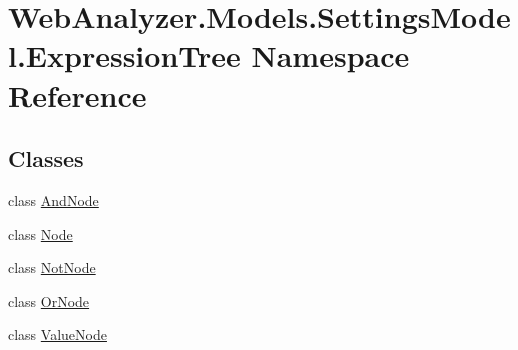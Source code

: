 \hypertarget{namespace_web_analyzer_1_1_models_1_1_settings_model_1_1_expression_tree}{}\section{Web\+Analyzer.\+Models.\+Settings\+Model.\+Expression\+Tree Namespace Reference}
\label{namespace_web_analyzer_1_1_models_1_1_settings_model_1_1_expression_tree}
\subsection*{Classes}
\begin{DoxyCompactItemize}
\item 
class \hyperlink{class_web_analyzer_1_1_models_1_1_settings_model_1_1_expression_tree_1_1_and_node}{And\+Node}
\item 
class \hyperlink{class_web_analyzer_1_1_models_1_1_settings_model_1_1_expression_tree_1_1_node}{Node}
\item 
class \hyperlink{class_web_analyzer_1_1_models_1_1_settings_model_1_1_expression_tree_1_1_not_node}{Not\+Node}
\item 
class \hyperlink{class_web_analyzer_1_1_models_1_1_settings_model_1_1_expression_tree_1_1_or_node}{Or\+Node}
\item 
class \hyperlink{class_web_analyzer_1_1_models_1_1_settings_model_1_1_expression_tree_1_1_value_node}{Value\+Node}
\end{DoxyCompactItemize}
